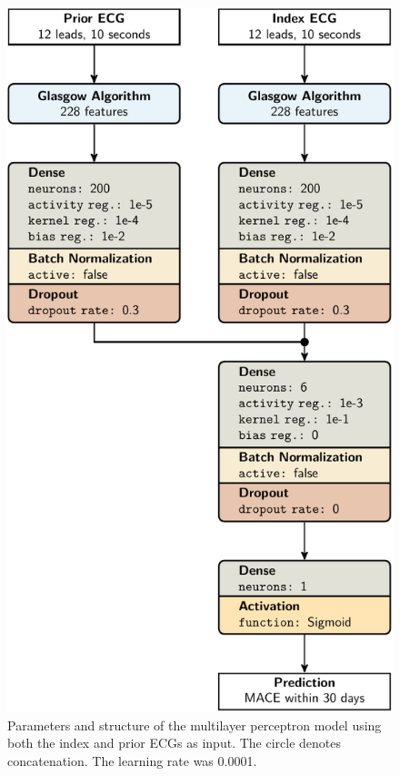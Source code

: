 \documentclass[preprint]{elsarticle}
\begin{document}
\begin{figure}[H]
\centering
\includegraphics[scale=\modelscale,keepaspectratio,trim=0 0 -16em 0]{figures/model-mlp2.pdf}
\caption{Parameters and structure of the multilayer perceptron model using both the index and prior ECGs as input. The circle denotes concatenation. The learning rate was 0.0001.}
\end{figure}
\end{document}
